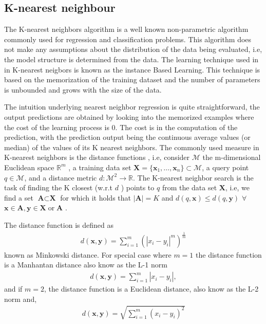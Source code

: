\subsection{K-nearest neighbour}

The K-nearest neighbors algorithm is a well known non-parametric algorithm commonly used for regression and classification problems. This algorithm does not make any assumptions about the distribution of the data being evaluated, i.e, the model structure is determined from the data. The learning technique used in in K-nearest neigbors is known as the instance Based Learning. This technique is based on the memorization of the training dataset and the number of parameters is unbounded and grows with the size of the data. 

The intuition underlying nearest neighbor regression is quite straightforward,
the output predictions are obtained by looking into the memorized examples where the cost of the learning process is 0. The cost is in the computation of the prediction, with the prediction output being the continuous average values (or median) of the values of its K nearest neighbors. The commonly used measure in K-nearest neighbors is the distance functions , i.e, consider $\mathcal{M}$ the m-dimensional Euclidean space $\mathbb{R}^m$  , a training data set $\textbf{X}=\{\textbf{x}_1,\dots, \textbf{x}_n\} \subset \mathcal{M}$, a query point $q\in \mathcal{M}$, and a distance metric $d:\mathcal{M}^2 \rightarrow \mathbb{R}$. The K-nearest neighbor search is the task of finding  the K closest (w.r.t $d$ ) points to $q$ from the data set $\textbf{X}$, i.e, we find a set $\textbf{A} \subset \textbf{X}$ for which it holds  that $|\textbf{A}|= K$ and  $d(q,\textbf{x})\leq d(q,\textbf{y})$ $\forall$ $\textbf{x}\in \textbf{A}, \textbf{y}\in \textbf{X} \;\text{or}\; \textbf{A}$ \citep{hyvonen2015fast}. 

The distance function is defined as 
\begin{align}
d(\textbf{x},\textbf{y})= \sum_{i=1}^m \left(|x_i -y_i|^m\right)^{\frac{1}{m}}
\end{align}
known as Minkowski distance. For special case where $m=1$ the distance function is a Manhantan distance also know as the L-1 norm
\begin{align}
d(\textbf{x},\textbf{y})= \sum_{i=1}^m|x_i -y_i|,
\end{align}
and if $m=2$, the distance function is a Euclidean distance, also know as the L-2 norm and, 
\begin{align}
d(\textbf{x},\textbf{y})= \sqrt{\sum_{i=1}^m \left(x_i -y_i \right)^2}
\end{align}
\citep{cunningham2007k}

